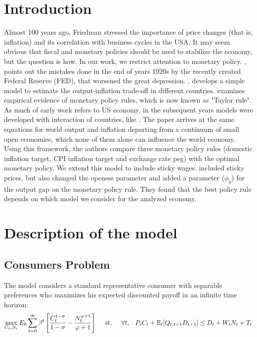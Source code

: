 \documentclass{article}
\newcommand{\Et}{\mathbb{E}_t}
\begin{document}
\section{Introduction}
Almost 100 years ago, Friedman stressed the importance of price changes (that is, inflation) and its correlation with business cycles in the USA. It may seem obvious that fiscal and monetary policies should be used to stabilize the economy, but the question is how. In our work, we restrict attention to monetary policy. \cite{friedman}, points out the mistakes done in the end of years 1920s by the recently created Federal Reserve (FED), that worsened the great depression. \cite{lucas}, develops a simple model to estimate the output-inflation trade-off in different countries. \cite{taylor_policy} examines empirical evidence of monetary policy rules, which is now known as "Taylor rule". As much of early work refers to US economy, in the subsequent years models were developed with interaction of countries, like \cite{gali_monacelli2002}. The \cite{gali_monacelli} paper arrives at the same equations for world output and inflation departing from a continuum of small open economies, which none of them alone can influence the world economy. Using this framework, the authors compare three monetary policy rules (domestic inflation target, CPI inflation target and exchange rate peg) with the optimal monetary policy. We extend this model to include sticky wages. \cite{rhee} included sticky prices, but also changed the openess parameter and added a parameter ($\phi_y$) for the output gap on the monetary policy rule. They found that the best policy rule depends on which model we consider for the analyzed economy.

\section{Description of the model}

\subsection{Consumers Problem}
The model considers a standard representative consumer with separable preferences who maximizes his expected discounted payoff in an infinite time horizon:
\begin{equation}
    \label{cons_problem}
    \max_{C_t, N_t} E_0 \sum^\infty_{t=0} \beta^t \left[\frac{C_t^{1-\sigma}}{1-\sigma} - \frac{N_t^{\varphi+1}}{\varphi+1} \right] \hspace{1em}  \textrm{ st. } \hspace{1em} \forall t, \hspace{0.8em} P_t C_t + \Et[Q_{t,t+1} D_{t+1}] \leq D_t +  W_t N_t + T_t
\end{equation}
\end{document}
